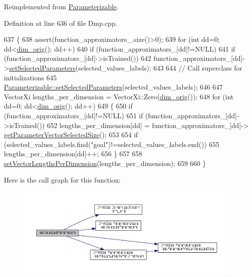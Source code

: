 Reimplemented from \hyperlink{classDmpBbo_1_1Parameterizable_a8a976b5db2d1809ece10e431816f0f27}{Parameterizable}.



Definition at line 636 of file Dmp.\+cpp.


\begin{DoxyCode}
637 \{
638   assert(function\_approximators\_.size()>0);
639   \textcolor{keywordflow}{for} (\textcolor{keywordtype}{int} dd=0; dd<\hyperlink{group__DynamicalSystems_ga93d7cbbf2e471b00f124e41706405a05}{dim\_orig}(); dd++)
640     \textcolor{keywordflow}{if} (function\_approximators\_[dd]!=NULL)
641       \textcolor{keywordflow}{if} (function\_approximators\_[dd]->isTrained())
642         function\_approximators\_[dd]->\hyperlink{classDmpBbo_1_1Dmp_a8a976b5db2d1809ece10e431816f0f27}{setSelectedParameters}(selected\_values\_labels);
643 
644   \textcolor{comment}{// Call superclass for initializations}
645   \hyperlink{classDmpBbo_1_1Parameterizable_a8a976b5db2d1809ece10e431816f0f27}{Parameterizable::setSelectedParameters}(selected\_values\_labels);
646 
647   VectorXi lengths\_per\_dimension = VectorXi::Zero(\hyperlink{group__DynamicalSystems_ga93d7cbbf2e471b00f124e41706405a05}{dim\_orig}());
648   \textcolor{keywordflow}{for} (\textcolor{keywordtype}{int} dd=0; dd<\hyperlink{group__DynamicalSystems_ga93d7cbbf2e471b00f124e41706405a05}{dim\_orig}(); dd++)
649   \{
650     \textcolor{keywordflow}{if} (function\_approximators\_[dd]!=NULL)
651       \textcolor{keywordflow}{if} (function\_approximators\_[dd]->isTrained())
652         lengths\_per\_dimension[dd] = function\_approximators\_[dd]->
      \hyperlink{classDmpBbo_1_1Parameterizable_ae83cb950bcf5219841e6ca8511ac2907}{getParameterVectorSelectedSize}();
653     
654     \textcolor{keywordflow}{if} (selected\_values\_labels.find(\textcolor{stringliteral}{"goal"})!=selected\_values\_labels.end())
655       lengths\_per\_dimension[dd]++;
656   \}
657   
658   \hyperlink{classDmpBbo_1_1Parameterizable_a77089aa6cc3b95dd0a1c17de7bc033b9}{setVectorLengthsPerDimension}(lengths\_per\_dimension);
659       
660 \}
\end{DoxyCode}


Here is the call graph for this function\+:
\nopagebreak
\begin{figure}[H]
\begin{center}
\leavevmode
\includegraphics[width=350pt]{classDmpBbo_1_1Dmp_a8a976b5db2d1809ece10e431816f0f27_cgraph}
\end{center}
\end{figure}


